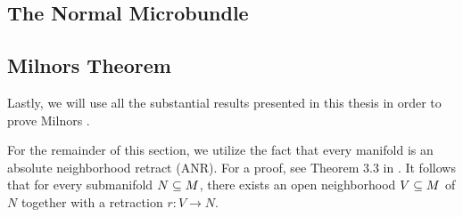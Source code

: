 \subsection*{The Normal Microbundle}\label{section::normal}   \subsection*{Milnors Theorem}\label{section::milnor} \begin{myparagraph} Lastly, we will use all the substantial results presented in this thesis in order to prove Milnors . \end{myparagraph}  \begin{myparagraph} For the remainder of this section, we utilize the fact that every manifold is an absolute neighborhood retract (ANR). For a proof, see Theorem 3.3 in \cite{hanner}. It follows that for every submanifold $N \subseteq{} M$, there exists an open neighborhood $V \subseteq{} M$ of $N$ together with a retraction $r: V \to N$.

\end{myparagraph}  